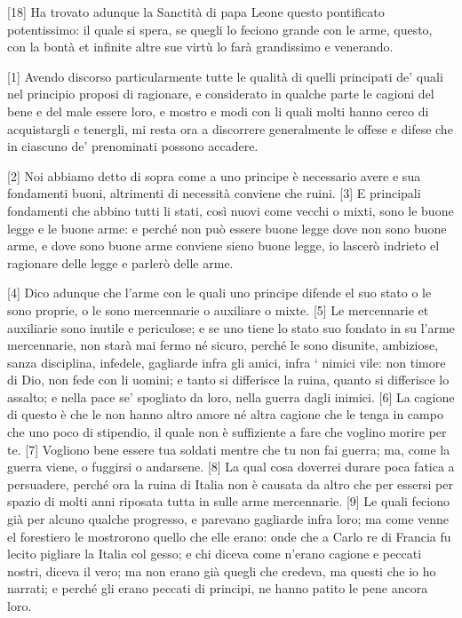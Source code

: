 \quebra

{[}18{]} Ha trovato adunque la
Sanctità di papa Leone questo pontificato potentissimo: il quale si
spera, se quegli lo feciono grande con le arme, questo, con la bontà et
infinite altre sue virtù lo farà grandissimo e venerando.


{[}1{]} Avendo discorso particularmente tutte le qualità di quelli
principati de' quali nel principio proposi di ragionare, e considerato
in qualche parte le cagioni del bene e del male essere loro, e mostro e
modi con li quali molti hanno cerco di acquistargli e tenergli, mi resta
ora a discorrere generalmente le offese e difese che in ciascuno de'
prenominati possono accadere.

{[}2{]} Noi abbiamo detto di sopra come a uno principe è necessario
avere e sua fondamenti buoni, altrimenti di necessità conviene che
ruini. {[}3{]} E principali fondamenti che abbino tutti li stati, così
nuovi come vecchi o mixti, sono le buone legge e le buone arme: e perché
non può essere buone legge dove non sono buone arme, e dove sono buone
arme conviene sieno buone legge, io lascerò indrieto el ragionare delle
legge e parlerò delle arme.

{[}4{]} Dico adunque che l'arme con le quali uno principe difende el suo
stato o le sono proprie, o le sono mercennarie o auxiliare o mixte.
{[}5{]} Le mercennarie et auxiliarie sono inutile e periculose; e se uno
tiene lo stato suo fondato in su l'arme mercennarie, non starà mai fermo
né sicuro, perché le sono disunite, ambiziose, sanza disciplina,
infedele, gagliarde infra gli amici, infra ` nimici vile: non timore di
Dio, non fede con li uomini; e tanto si differisce la ruina, quanto si
differisce lo assalto; e nella pace se' spogliato da loro, nella guerra
dagli inimici. {[}6{]} La cagione di questo è che le non hanno altro
amore né altra cagione che le tenga in campo che uno poco di stipendio,
il quale non è suffiziente a fare che voglino morire per te. {[}7{]}
Vogliono bene essere tua soldati mentre che tu non fai guerra; ma, come
la guerra viene, o fuggirsi o andarsene. {[}8{]} La qual cosa doverrei
durare poca fatica a persuadere, perché ora la ruina di Italia non è
causata da altro che per essersi per spazio di molti anni riposata tutta
in sulle arme mercennarie. {[}9{]} Le quali feciono già per alcuno
qualche progresso, e parevano gagliarde infra loro; ma come venne el
forestiero le mostrorono quello che elle erano: onde che a Carlo re di
Francia fu lecito pigliare la Italia col gesso; e chi diceva come
n'erano cagione e peccati nostri, diceva il vero; ma non erano già
quegli che credeva, ma questi che io ho narrati; e perché gli erano
peccati di principi, ne hanno patito le pene ancora loro.

